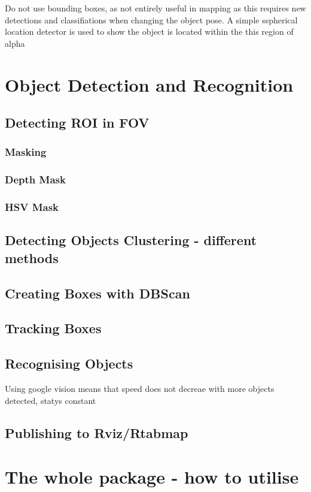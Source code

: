 \documentclass{mproj}
\begin{document}
Do not use bounding boxes, as not entirely useful in mapping as this requires new detections and classifiations when changing the object pose. A simple sspherical location detector is used to show the object is located within the this region of alpha

\section{Object Detection and Recognition}
\subsection{Detecting ROI in FOV}
\subsubsection{Masking}
\subsubsection{Depth Mask}
\subsubsection{HSV Mask}
\subsection{Detecting Objects Clustering - different methods}
\subsection{Creating Boxes with DBScan}
\subsection{Tracking Boxes}
\subsection{Recognising Objects}

Using google vision means that speed does not decreae with more objects detected, statys constant

\subsection{Publishing to Rviz/Rtabmap}
\section{The whole package - how to utilise}
\end{document}
